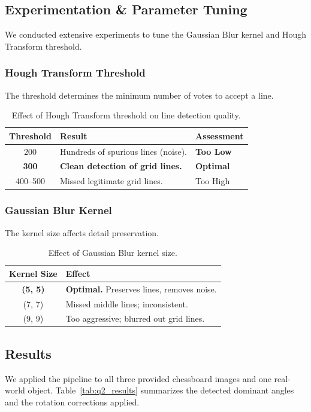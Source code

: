 \documentclass[12pt]{article}
\begin{document}
\subsection{Experimentation \& Parameter Tuning}
We conducted extensive experiments to tune the Gaussian Blur kernel and Hough Transform threshold.

\subsubsection{Hough Transform Threshold}
The threshold determines the minimum number of votes to accept a line.
\begin{table}[H]
\centering
\begin{tabular}{|c|l|l|}
\hline
\textbf{Threshold} & \textbf{Result} & \textbf{Assessment} \\ \hline
200 & Hundreds of spurious lines (noise). & \textbf{Too Low} \\ \hline
\textbf{300} & \textbf{Clean detection of grid lines.} & \textbf{Optimal} \\ \hline
400--500 & Missed legitimate grid lines. & Too High \\ \hline
\end{tabular}
\caption{Effect of Hough Transform threshold on line detection quality.}
\label{tab:q2_threshold}
\end{table}

\subsubsection{Gaussian Blur Kernel}
The kernel size affects detail preservation.
\begin{table}[H]
\centering
\begin{tabular}{|c|l|}
\hline
\textbf{Kernel Size} & \textbf{Effect} \\ \hline
\textbf{(5, 5)} & \textbf{Optimal.} Preserves lines, removes noise. \\ \hline
(7, 7) & Missed middle lines; inconsistent. \\ \hline
(9, 9) & Too aggressive; blurred out grid lines. \\ \hline
\end{tabular}
\caption{Effect of Gaussian Blur kernel size.}
\label{tab:q2_blur}
\end{table}

\subsection{Results}
We applied the pipeline to all three provided chessboard images and one real-world object. Table~\ref{tab:q2_results} summarizes the detected dominant angles and the rotation corrections applied.
\end{document}
